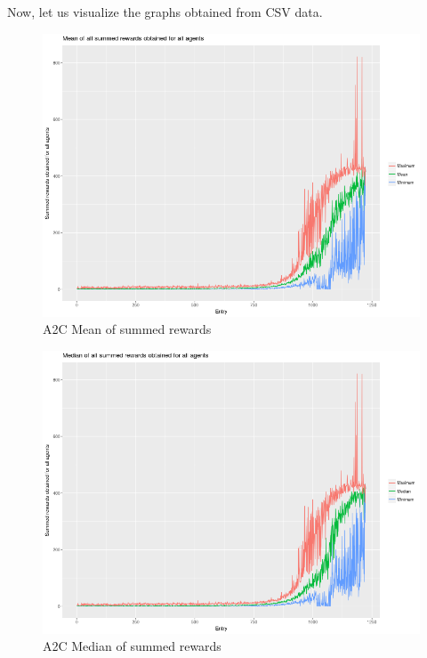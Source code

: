 \documentclass[11pt,twoside,a4paper]{article}
\begin{document}
Now, let us visualize the graphs obtained from CSV data.

\begin{figure}[H]
  \includegraphics[scale=0.35]{log-analysis/a2c-mean-summed-rewards.png}
  \centering
  \caption{A2C Mean of summed rewards}
  \label{fig:a2c-mean-summed-rewards}
\end{figure}

\begin{figure}[H]
  \includegraphics[scale=0.35]{log-analysis/a2c-median-summed-rewards.png}
  \centering
  \caption{A2C Median of summed rewards}
  \label{fig:a2c-median-summed-rewards}
\end{figure}
\end{document}
